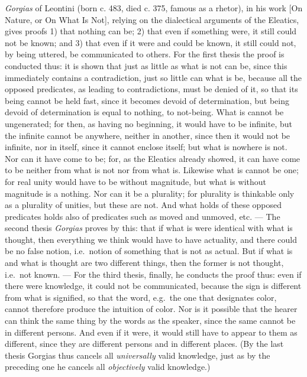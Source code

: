 \emph{Gorgias} of Leontini (born c. 483, died c. 375, famous as a rhetor),
in his work  [On Nature, or On What Is Not],
relying on the dialectical arguments of the Eleatics, gives proofs 1) that
nothing can be; 2) that even if something were, it still could not be known;
and 3) that even if it were and could be known, it still could not, by being
uttered, be communicated to others. For the first thesis the proof is
conducted thus: it is shown that just as little as what is not can be, since
this immediately contains a contradiction, just so little can what is be,
because all the opposed predicates, as leading to contradictions, must be
denied of it, so that its being cannot be held fast, since it becomes devoid
of determination, but being devoid of determination is equal to nothing, to
not-being. What is cannot be ungenerated; for then, as having no beginning,
it would have to be infinite, but the infinite cannot be anywhere, neither in
another, since then it would not be infinite, nor in itself, since it cannot
enclose itself; but what is nowhere is not. Nor can it have come to be; for,
as the Eleatics already showed, it can have come to be neither from what is
not nor from what is. Likewise what is cannot be one; for real unity would
have to be without magnitude, but what is without magnitude is a nothing. Nor
can it be a plurality; for plurality is thinkable only as a plurality of
unities, but these are not. And what holds of these opposed predicates holds
also of predicates such as moved and unmoved, etc.
--- The second thesis \emph{Gorgias} proves by this: that if what is were
identical with what is thought, then everything we think would have to have
actuality, and there could be no false notion, i.e.\ notion of something that
is not as actual. But if what is and what is thought are two different
things, then the former is not thought, i.e.\ not known. --- For the third
thesis, finally, he conducts the proof thus: even if there were
 \setcounter{footnote}{0}
knowledge, it could not be communicated, because the sign is different from
what is signified, so that the word, e.g.\ the one that designates color,
cannot therefore produce the intuition of color. Nor is it possible that the
hearer can think the same thing by the words as the speaker, since the same
cannot be in different persons. And even if it were, it would still have to
appear to them as different, since they are different persons and in
different places. (By the last thesis Gorgias thus cancels all
\emph{universally} valid knowledge, just as by the preceding one he cancels
all \emph{objectively} valid knowledge.)

